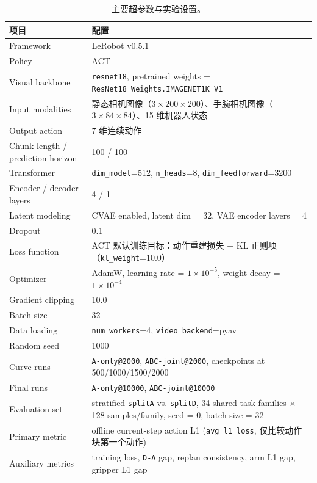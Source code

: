 \documentclass{article}
\begin{document}
\begin{table}[H]
  \centering
  \small
  \caption{主要超参数与实验设置。}
  \label{tab:hyperparams}
  \begin{tabular}{L{3.5cm}L{10.0cm}}
    \toprule
    项目 & 配置 \\
    \midrule
    Framework & LeRobot v0.5.1 \\
    Policy & ACT \\
    Visual backbone & \texttt{resnet18}, pretrained weights = \texttt{ResNet18\_Weights.IMAGENET1K\_V1} \\
    Input modalities & 静态相机图像（$3 \times 200 \times 200$）、手腕相机图像（$3 \times 84 \times 84$）、15 维机器人状态 \\
    Output action & 7 维连续动作 \\
    Chunk length / prediction horizon & 100 / 100 \\
    Transformer & \texttt{dim\_model}=512, \texttt{n\_heads}=8, \texttt{dim\_feedforward}=3200 \\
    Encoder / decoder layers & 4 / 1 \\
    Latent modeling & CVAE enabled, latent dim = 32, VAE encoder layers = 4 \\
    Dropout & 0.1 \\
    Loss function & ACT 默认训练目标：动作重建损失 + KL 正则项（\texttt{kl\_weight}=10.0） \\
    Optimizer & AdamW, learning rate = $1\times10^{-5}$, weight decay = $1\times10^{-4}$ \\
    Gradient clipping & 10.0 \\
    Batch size & 32 \\
    Data loading & \texttt{num\_workers}=4, \texttt{video\_backend}=pyav \\
    Random seed & 1000 \\
    Curve runs & \texttt{A-only@2000}, \texttt{ABC-joint@2000}, checkpoints at 500/1000/1500/2000 \\
    Final runs & \texttt{A-only@10000}, \texttt{ABC-joint@10000} \\
    Evaluation set & stratified \texttt{splitA} vs. \texttt{splitD}, 34 shared task families $\times$ 128 samples/family, seed = 0, batch size = 32 \\
    Primary metric & offline current-step action L1 (\texttt{avg\_l1\_loss}, 仅比较动作块第一个动作) \\
    Auxiliary metrics & training loss, \texttt{D-A} gap, replan consistency, arm L1 gap, gripper L1 gap \\
    \bottomrule
  \end{tabular}
\end{table}
\end{document}
